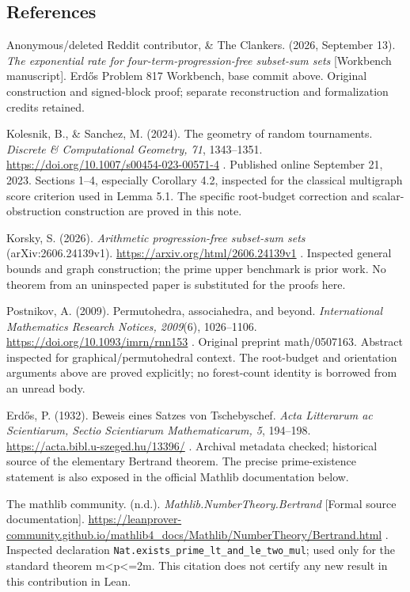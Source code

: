\subsection{References}\label{n08-references}

Anonymous/deleted Reddit contributor, \& The Clankers. (2026, September 13). \emph{The exponential rate for four-term-progression-free subset-sum sets} {[}Workbench manuscript{]}. Erdős Problem 817 Workbench, base commit above. Original construction and signed-block proof; separate reconstruction and formalization credits retained.

Kolesnik, B., \& Sanchez, M. (2024). The geometry of random tournaments. \emph{Discrete \& Computational Geometry, 71}, 1343--1351. \url{https://doi.org/10.1007/s00454-023-00571-4} . Published online September 21, 2023. Sections 1--4, especially Corollary 4.2, inspected for the classical multigraph score criterion used in Lemma 5.1. The specific root-budget correction and scalar-obstruction construction are proved in this note.

Korsky, S. (2026). \emph{Arithmetic progression-free subset-sum sets} (arXiv:2606.24139v1). \url{https://arxiv.org/html/2606.24139v1} . Inspected general bounds and graph construction; the prime upper benchmark is prior work. No theorem from an uninspected paper is substituted for the proofs here.

Postnikov, A. (2009). Permutohedra, associahedra, and beyond. \emph{International Mathematics Research Notices, 2009}(6), 1026--1106. \url{https://doi.org/10.1093/imrn/rnn153} . Original preprint math/0507163. Abstract inspected for graphical/permutohedral context. The root-budget and orientation arguments above are proved explicitly; no forest-count identity is borrowed from an unread body.

Erdős, P. (1932). Beweis eines Satzes von Tschebyschef. \emph{Acta Litterarum ac Scientiarum, Sectio Scientiarum Mathematicarum, 5}, 194--198. \url{https://acta.bibl.u-szeged.hu/13396/} . Archival metadata checked; historical source of the elementary Bertrand theorem. The precise prime-existence statement is also exposed in the official Mathlib documentation below.

The mathlib community. (n.d.). \emph{Mathlib.NumberTheory.Bertrand} {[}Formal source documentation{]}. \url{https://leanprover-community.github.io/mathlib4_docs/Mathlib/NumberTheory/Bertrand.html} . Inspected declaration \nolinkurl{Nat.exists_prime_lt_and_le_two_mul}; used only for the standard theorem m\textless p\textless=2m. This citation does not certify any new result in this contribution in Lean.

